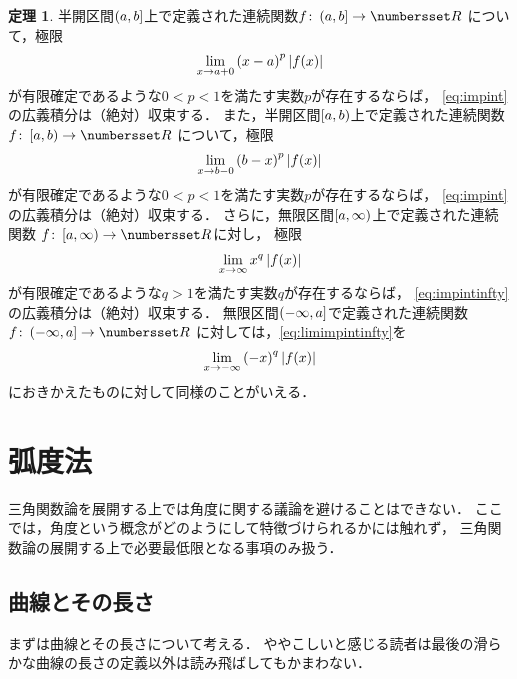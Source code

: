 \documentclass[11pt,a4paper]{ltjsarticle}
\theoremstyle{definition}
\newtheorem{thm}[dfn]{定理}
\begin{document}
\begin{thm} \label{thm:impintconv}
  半開区間$\interval{lop}{a,b}$上で定義された連続関数$f \colon \interval{lop}{a,b} \to \Real$
  について，極限
  \begin{align}
    \lim_{x \to a+0} \paren{x - a}^p \absolute{\apply{f}{x}}
    \label{eq:limimpint}
  \end{align}
  が有限確定であるような$0 < p < 1$を満たす実数$p$が存在するならば，
  \cref{eq:impint}の広義積分は（絶対）収束する．
  また，半開区間$\interval{rop}{a,b}$上で定義された連続関数$f \colon \interval{rop}{a,b} \to \Real$
  について，極限
  \begin{align}
    \lim_{x \to b - 0} \paren{b - x}^p \absolute{\apply{f}{x}}
    \label{eq:limimpint2}
  \end{align}
  が有限確定であるような$0 < p < 1$を満たす実数$p$が存在するならば，
  \cref{eq:impint}の広義積分は（絶対）収束する．
  さらに，無限区間$\interval{rop}{a, \infty}$上で定義された連続関数
  $f \colon \interval{rop}{a, \infty} \to \Real$に対し，
  極限
  \begin{align}
    \lim_{x \to \infty} x^q \absolute{\apply{f}{x}}
    \label{eq:limimpintinfty}
  \end{align}
  が有限確定であるような$q > 1$を満たす実数$q$が存在するならば，
  \cref{eq:impintinfty}の広義積分は（絶対）収束する．
  無限区間$\interval{lop}{- \infty, a}$で定義された連続関数$f \colon \interval{lop}{-\infty , a} \to \Real$
  に対しては，\cref{eq:limimpintinfty}を
  \begin{align}
    \lim_{x \to - \infty} \paren{-x}^q \absolute{\apply{f}{x}}
    \label{eq:limintminusinfty}
  \end{align}
  におきかえたものに対して同様のことがいえる．
\end{thm}


\section{弧度法}


三角関数論を展開する上では角度に関する議論を避けることはできない．
ここでは，角度という概念がどのようにして特徴づけられるかには触れず，
三角関数論の展開する上で必要最低限となる事項のみ扱う．


\subsection{曲線とその長さ} \label{subsec:curvelength}

まずは曲線とその長さについて考える．
ややこしいと感じる読者は最後の滑らかな曲線の長さの定義以外は読み飛ばしてもかまわない．
\end{document}
